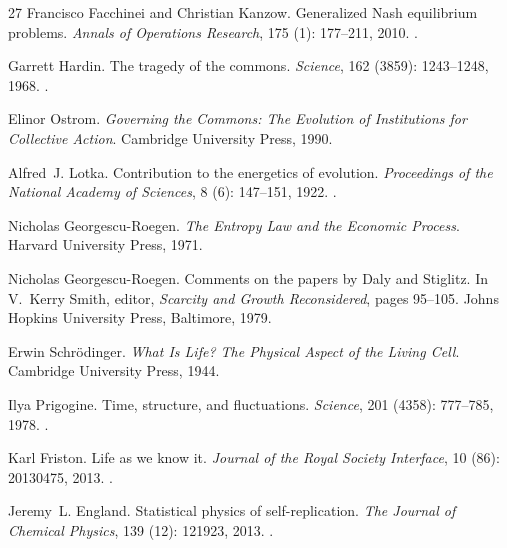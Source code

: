 \documentclass[11pt]{article}
\theoremstyle{plain}
\theoremstyle{definition}
\theoremstyle{remark}
\begin{document}
\begin{thebibliography}{27}
Francisco Facchinei and Christian Kanzow.
\newblock Generalized {Nash} equilibrium problems.
\newblock \emph{Annals of Operations Research}, 175 (1):
  177--211, 2010.
\newblock {}.

Garrett Hardin.
\newblock The tragedy of the commons.
\newblock \emph{Science}, 162 (3859): 1243--1248, 1968.
\newblock {}.

Elinor Ostrom.
\newblock \emph{Governing the Commons: The Evolution of Institutions for
  Collective Action}.
\newblock Cambridge University Press, 1990.

Alfred~J. Lotka.
\newblock Contribution to the energetics of evolution.
\newblock \emph{Proceedings of the National Academy of Sciences}, 8
  (6): 147--151, 1922.
\newblock {}.

Nicholas Georgescu-Roegen.
\newblock \emph{The Entropy Law and the Economic Process}.
\newblock Harvard University Press, 1971.

Nicholas Georgescu-Roegen.
\newblock Comments on the papers by {Daly} and {Stiglitz}.
\newblock In V.~Kerry Smith, editor, \emph{Scarcity and Growth Reconsidered},
  pages 95--105. Johns Hopkins University Press, Baltimore, 1979.

Erwin Schr{\"o}dinger.
\newblock \emph{What Is Life? The Physical Aspect of the Living Cell}.
\newblock Cambridge University Press, 1944.

Ilya Prigogine.
\newblock Time, structure, and fluctuations.
\newblock \emph{Science}, 201 (4358): 777--785, 1978.
\newblock {}.

Karl Friston.
\newblock Life as we know it.
\newblock \emph{Journal of the Royal Society Interface}, 10
  (86): 20130475, 2013.
\newblock {}.

Jeremy~L. England.
\newblock Statistical physics of self-replication.
\newblock \emph{The Journal of Chemical Physics}, 139 (12):
  121923, 2013.
\newblock {}.


\end{thebibliography}
\end{document}
